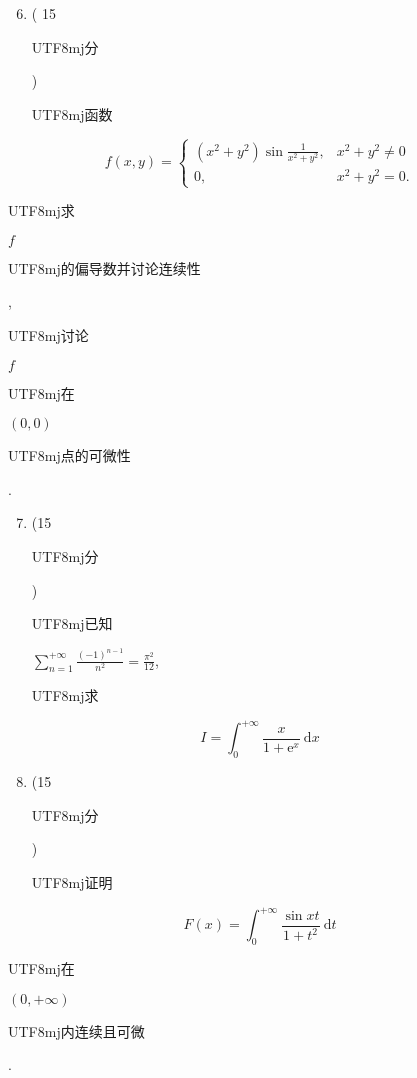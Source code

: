 \documentclass[10pt]{article}
\begin{document}
\begin{enumerate}
  \setcounter{enumi}{5}
  \item ( 15 \begin{CJK}{UTF8}{mj}分\end{CJK}) \begin{CJK}{UTF8}{mj}函数\end{CJK}
\end{enumerate}
$$
f(x, y)= \begin{cases}\left(x^{2}+y^{2}\right) \sin \frac{1}{x^{2}+y^{2}}, & x^{2}+y^{2} \neq 0 \\ 0, & x^{2}+y^{2}=0 .\end{cases}
$$
\begin{CJK}{UTF8}{mj}求\end{CJK} $f$ \begin{CJK}{UTF8}{mj}的偏导数并讨论连续性\end{CJK}, \begin{CJK}{UTF8}{mj}讨论\end{CJK} $f$ \begin{CJK}{UTF8}{mj}在\end{CJK} $(0,0)$ \begin{CJK}{UTF8}{mj}点的可微性\end{CJK}.

\begin{enumerate}
  \setcounter{enumi}{6}
  \item (15 \begin{CJK}{UTF8}{mj}分\end{CJK}) \begin{CJK}{UTF8}{mj}已知\end{CJK} $\sum_{n=1}^{+\infty} \frac{(-1)^{n-1}}{n^{2}}=\frac{\pi^{2}}{12}$, \begin{CJK}{UTF8}{mj}求\end{CJK}
\end{enumerate}
$$
I=\int_{0}^{+\infty} \frac{x}{1+\mathrm{e}^{x}} \mathrm{~d} x
$$

\begin{enumerate}
  \setcounter{enumi}{7}
  \item (15 \begin{CJK}{UTF8}{mj}分\end{CJK}) \begin{CJK}{UTF8}{mj}证明\end{CJK}
\end{enumerate}
$$
F(x)=\int_{0}^{+\infty} \frac{\sin x t}{1+t^{2}} \mathrm{~d} t
$$
\begin{CJK}{UTF8}{mj}在\end{CJK} $(0,+\infty)$ \begin{CJK}{UTF8}{mj}内连续且可微\end{CJK}.
\end{document}
